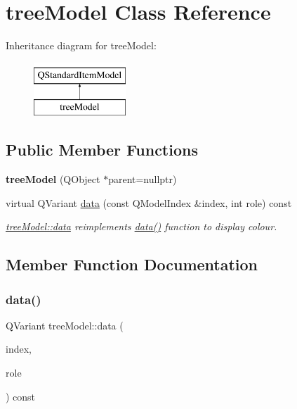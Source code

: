 \hypertarget{classtree_model}{}\section{tree\+Model Class Reference}
\label{classtree_model}
Inheritance diagram for tree\+Model\+:\begin{figure}[H]
\begin{center}
\leavevmode
\includegraphics[height=2.000000cm]{classtree_model}
\end{center}
\end{figure}
\subsection*{Public Member Functions}
\begin{DoxyCompactItemize}
\item 
\mbox{\label{classtree_model_aacfea32c612071ff4495ce764b82d618}} 
{\bfseries tree\+Model} (Q\+Object $\ast$parent=nullptr)
\item 
virtual Q\+Variant \mbox{\hyperlink{classtree_model_add38ff680cd2a926d201c0760234419d}{data}} (const Q\+Model\+Index \&index, int role) const
\begin{DoxyCompactList}\small\item\em \mbox{\hyperlink{classtree_model_add38ff680cd2a926d201c0760234419d}{tree\+Model\+::data}} reimplements \mbox{\hyperlink{classtree_model_add38ff680cd2a926d201c0760234419d}{data()}} function to display colour. \end{DoxyCompactList}\end{DoxyCompactItemize}


\subsection{Member Function Documentation}
\mbox{\label{classtree_model_add38ff680cd2a926d201c0760234419d}} 
\subsubsection{\texorpdfstring{data()}{data()}}
{\footnotesize\ttfamily Q\+Variant tree\+Model\+::data (\begin{DoxyParamCaption}\item[{const Q\+Model\+Index \&}]{index,  }\item[{int}]{role }\end{DoxyParamCaption}) const\hspace{0.3cm}{\ttfamily [virtual]}}



